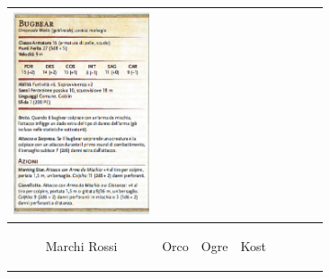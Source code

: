 \documentclass{article}
\begin{document}
\begin{table}[h]
\begin{tabular}{cr|cr|cr|cr}
            \includegraphics[width=4cm,height = 6cm]{../Mostri/Bugbear.png}\\
              \hline
            \hypertarget{marchirossi}{Marchi Rossi} & \hypertarget{orco}{Orco} & \hypertarget{ogre}{Ogre}&\hypertarget{kost}{Kost}\\

\end{tabular}
\end{table}
\end{document}
